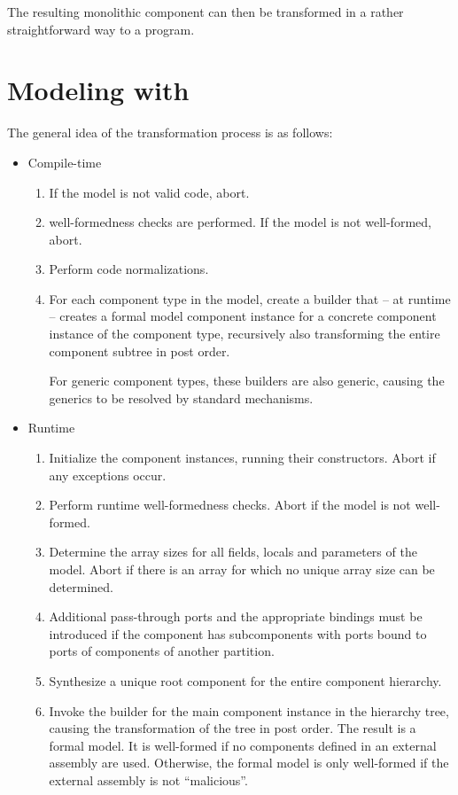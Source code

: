 \documentclass[a4paper,10pt,english]{article}
\begin{document}
The resulting monolithic component can then be transformed in a rather straightforward way to a \Fil program.

\section{Modeling with \SafetySharp}
The general idea of the transformation process is as follows:
\begin{itemize}
	\item Compile-time
	\begin{enumerate}
		\item If the \SSharp model is not valid \CSharp code, abort.
		\item \SSharp well-formedness checks are performed. If the model is not well-formed, abort.
		\item Perform \CSharp code normalizations.
		\item For each component type in the \SSharp model, create a builder that -- at runtime -- creates a formal
		model component instance for a concrete \SSharp component instance of the component type, recursively also transforming the
		entire component subtree in post order. 
		
		For generic component types, these builders are also generic, causing the generics to be resolved by standard \DotNet
		mechanisms.
	\end{enumerate}
	
	\item Runtime
	\begin{enumerate}
		\item Initialize the component instances, running their constructors. Abort if any exceptions occur.
		\item Perform runtime well-formedness checks. Abort if the model is not well-formed.
		\item Determine the array sizes for all fields, locals and parameters of the model. Abort if there is an array for which no
		unique array size can be determined.
		\item Additional pass-through ports and the appropriate bindings must be introduced if the component has subcomponents with ports
		bound to ports of components of another partition.
		\item Synthesize a unique root component for the entire component hierarchy.
		\item Invoke the builder for the main component instance in the hierarchy tree, causing the transformation of the tree in post
		order. The result is a formal model. It is well-formed if no components defined in an external assembly are used. Otherwise, the
		formal model is only well-formed if the external assembly is not ``malicious''.
	\end{enumerate}
\end{itemize}
\end{document}
